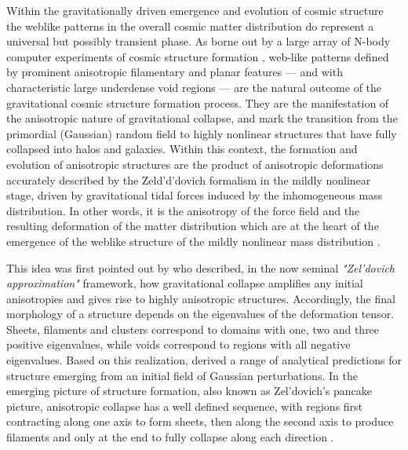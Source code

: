\documentclass[useAMS,usenatbib]{mnras}
\begin{document}
Within the gravitationally driven emergence and evolution of cosmic structure the weblike patterns in the overall cosmic matter 
distribution do represent a universal but possibly transient phase. As borne out by a large array of N-body computer experiments 
of cosmic structure formation \citep[e.g.][]{springmillen2005,illustris2014,eagle2015}, web-like patterns 
defined by prominent anisotropic filamentary and planar features --- and with characteristic large underdense void regions --- are the 
natural outcome of the gravitational cosmic structure formation process. They are the manifestation of the anisotropic nature of gravitational 
collapse, and mark the transition from the primordial (Gaussian) random field to highly nonlinear structures that have fully collapsed into halos 
and galaxies. 
Within this context, the formation and evolution of anisotropic structures are the product of anisotropic deformations accurately described by the Zeld'd'dovich formalism in the mildly nonlinear stage, driven by gravitational tidal forces induced by the inhomogeneous mass distribution.
%
 In other words, it is the anisotropy of the force field and the resulting deformation of 
the matter distribution which are at the heart of the emergence of the weblike structure of the mildly nonlinear mass distribution \citep[also see][]{bondweb1996,hahn2007a,weybond2008,forero2009}.

This idea was first pointed out by \citet[][also see \citealt{icke1973}]{zeldovich1970} who described, in the now seminal \emph{"Zel'dovich approximation"} framework, how gravitational collapse amplifies any initial anisotropies and gives rise to 
highly anisotropic structures. Accordingly, the final morphology of a structure depends on 
the eigenvalues of the deformation tensor.  Sheets, filaments and clusters correspond to domains with one, two and three positive 
eigenvalues, while voids correspond to regions with all negative eigenvalues. Based on this realization, \cite{doroshkevich1970} derived 
a range of analytical predictions for structure emerging from an initial field of Gaussian perturbations. In the emerging picture of 
structure formation, also known as Zel'dovich's pancake picture, anisotropic collapse has a well defined sequence, with regions first 
contracting along one axis to form sheets, then along the second axis to produce filaments and only at the end to fully collapse along 
each direction \citep{shandzeld1989,shandsuny2009}. 
\end{document}
